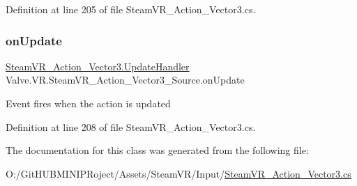 Definition at line 205 of file Steam\+V\+R\+\_\+\+Action\+\_\+\+Vector3.\+cs.

\mbox{\label{class_valve_1_1_v_r_1_1_steam_v_r___action___vector3___source_adbe28a16590bb19cb1e996dc8755dc95}} 
\subsubsection{\texorpdfstring{onUpdate}{onUpdate}}
{\footnotesize\ttfamily \mbox{\hyperlink{class_valve_1_1_v_r_1_1_steam_v_r___action___vector3_a99c0524f104c6d8c94a0e874b0ecc813}{Steam\+V\+R\+\_\+\+Action\+\_\+\+Vector3.\+Update\+Handler}} Valve.\+V\+R.\+Steam\+V\+R\+\_\+\+Action\+\_\+\+Vector3\+\_\+\+Source.\+on\+Update}



Event fires when the action is updated 



Definition at line 208 of file Steam\+V\+R\+\_\+\+Action\+\_\+\+Vector3.\+cs.



The documentation for this class was generated from the following file\+:\begin{DoxyCompactItemize}
\item 
O\+:/\+Git\+H\+U\+B\+M\+I\+N\+I\+P\+Roject/\+Assets/\+Steam\+V\+R/\+Input/\mbox{\hyperlink{_steam_v_r___action___vector3_8cs}{Steam\+V\+R\+\_\+\+Action\+\_\+\+Vector3.\+cs}}\end{DoxyCompactItemize}
